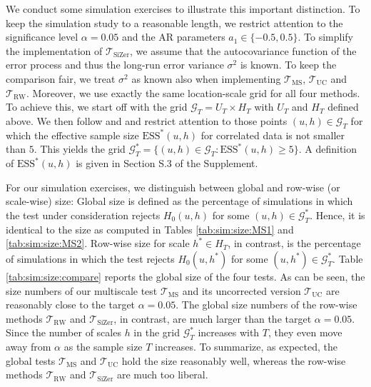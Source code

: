 

We conduct some simulation exercises to illustrate this important distinction. To keep the simulation study to a reasonable length, we restrict attention to the significance level $\alpha=0.05$ and the AR parameters $a_1 \in \{-0.5,0.5\}$. To simplify the implementation of $\mathcal{T}_{\text{SiZer}}$, we assume that the autocovariance function of the error process and thus the long-run error variance $\sigma^2$ is known. To keep the comparison fair, we treat $\sigma^2$ as known also when implementing $\mathcal{T}_{\text{MS}}$, $\mathcal{T}_{\text{UC}}$ and $\mathcal{T}_{\text{RW}}$. Moreover, we use exactly the same location-scale grid for all four methods. To achieve this, we start off with the grid $\mathcal{G}_T = U_T \times H_T$ with $U_T$ and $H_T$ defined above. We then follow \cite{Rondonotti2007} and \cite{ParkHannigKang2009} and restrict attention to those points $(u,h) \in \mathcal{G}_T$ for which the effective sample size $\text{ESS}^*(u,h)$ for correlated data is not smaller than $5$. This yields the grid $\mathcal{G}_T^* = \{ (u, h) \in \mathcal{G}_T : \text{ESS}^*(u, h) \geq 5 \}$. A definition of $\text{ESS}^*(u,h)$ is given in Section S.3 of the Supplement. 


For our simulation exercises, we distinguish between global and row-wise (or scale-wise) size: Global size is defined as the percentage of simulations in which the test under consideration rejects $H_0(u,h)$ for some $(u,h) \in \mathcal{G}_T^*$. Hence, it is identical to the size as computed in Tables \ref{tab:sim:size:MS1} and \ref{tab:sim:size:MS2}. Row-wise size for scale $h^* \in H_T$, in contrast, is the percentage of simulations in which the test rejects $H_0(u,h^*)$ for some $(u,h^*) \in \mathcal{G}_T^*$. Table \ref{tab:sim:size:compare} reports the global size of the four tests. As can be seen, the size numbers of our multiscale test $\mathcal{T}_{\text{MS}}$ and its uncorrected version $\mathcal{T}_{\text{UC}}$ are reasonably close to the target $\alpha=0.05$. The global size numbers of the row-wise methods $\mathcal{T}_{\text{RW}}$ and $\mathcal{T}_{\text{SiZer}}$, in contrast, are much larger than the target $\alpha=0.05$. Since the number of scales $h$ in the grid $\mathcal{G}_T^*$ increases with $T$, they even move away from $\alpha$ as the sample size $T$ increases. To summarize, as expected, the global tests $\mathcal{T}_{\text{MS}}$ and $\mathcal{T}_{\text{UC}}$ hold the size reasonably well, whereas the row-wise methods $\mathcal{T}_{\text{RW}}$ and $\mathcal{T}_{\text{SiZer}}$ are much too liberal. 



